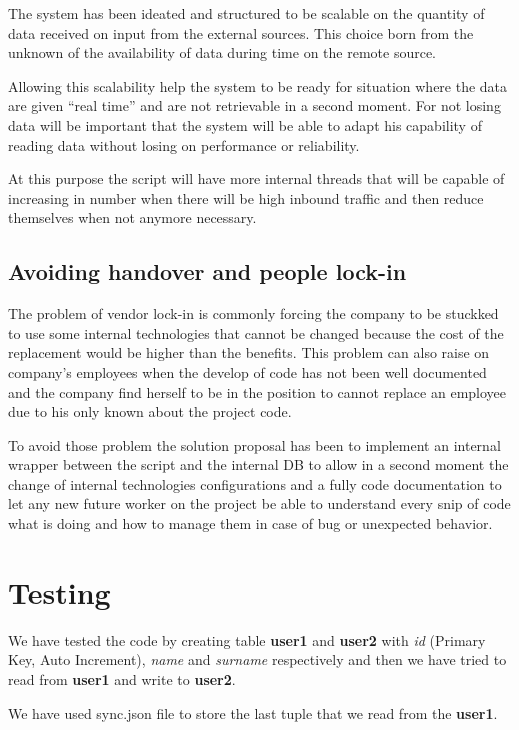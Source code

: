 The system has been ideated and structured to be scalable on the quantity of data received on input from the external sources.
This choice born from the unknown of the availability of data during time on the remote source.

Allowing this scalability help the system to be ready for situation where the data are given “real time” and are not retrievable in a second moment. For not losing data will be important that the system will be able to adapt his capability of reading data without losing on performance or reliability.

At this purpose the script will have more internal threads that will be capable of increasing in number when there will be high inbound traffic and then reduce themselves when not anymore necessary.

\subsection{Avoiding handover and people lock-in}

The problem of vendor lock-in is commonly forcing the company to be stuckked to use some internal technologies that cannot be changed because the cost of the replacement would be higher than the benefits. This problem can also raise on company’s employees when the develop of code has not been well documented and the company find herself to be in the position to cannot replace an employee due to his only known about the project code.

To avoid those problem the solution proposal has been to implement an internal wrapper between the script and the internal DB to allow in a second moment the change of internal technologies configurations and a fully code documentation to let any new future worker on the project be able to understand every snip of code what is doing and how to manage them in case of bug or unexpected behavior.

\section{Testing}

We have tested the code by creating table \textbf{user1} and \textbf{user2} with \textit{id} (Primary Key, Auto Increment), \textit{name} and \textit{surname} respectively and then we have tried to read from \textbf{user1} and write to \textbf{user2}.

We have used sync.json file to store the last tuple that we read from the \textbf{user1}.

